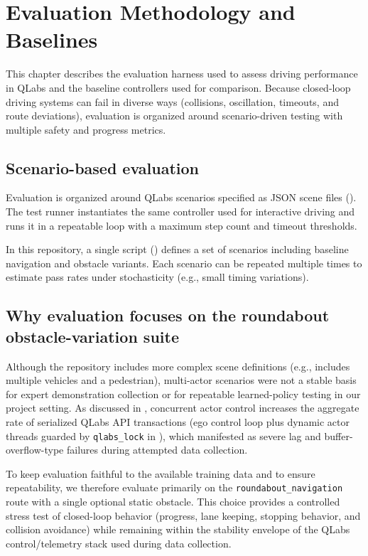 \chapter{Evaluation Methodology and Baselines}
\label{ch:evaluation}

This chapter describes the evaluation harness used to assess driving performance in QLabs and the baseline controllers used for comparison. Because closed-loop driving systems can fail in diverse ways (collisions, oscillation, timeouts, and route deviations), evaluation is organized around scenario-driven testing with multiple safety and progress metrics.

\section{Scenario-based evaluation}
\label{sec:scenario-eval}
Evaluation is organized around QLabs scenarios specified as JSON scene files (). The test runner instantiates the same controller used for interactive driving and runs it in a repeatable loop with a maximum step count and timeout thresholds.

In this repository, a single script () defines a set of scenarios including baseline navigation and obstacle variants. Each scenario can be repeated multiple times to estimate pass rates under stochasticity (e.g., small timing variations).

\section{Why evaluation focuses on the roundabout obstacle-variation suite}
\label{sec:eval-roundabout-rationale}
Although the repository includes more complex scene definitions (e.g.,  includes multiple vehicles and a pedestrian), multi-actor scenarios were not a stable basis for expert demonstration collection or for repeatable learned-policy testing in our project setting.
As discussed in , concurrent actor control increases the aggregate rate of serialized QLabs API transactions (ego control loop plus dynamic actor threads guarded by \texttt{qlabs\_lock} in ), which manifested as severe lag and buffer-overflow-type failures during attempted data collection.

To keep evaluation faithful to the available training data and to ensure repeatability, we therefore evaluate primarily on the \texttt{roundabout\_navigation} route with a single optional static obstacle.
This choice provides a controlled stress test of closed-loop behavior (progress, lane keeping, stopping behavior, and collision avoidance) while remaining within the stability envelope of the QLabs control/telemetry stack used during data collection.


